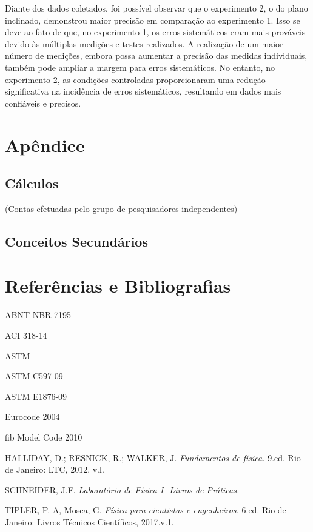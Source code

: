 \documentclass[12pt, letterpaper]{article}
\begin{document}
Diante dos dados coletados, foi possível observar que o experimento 2, o do plano inclinado, demonstrou maior precisão em comparação ao experimento 1. Isso se deve ao fato de que, no experimento 1, os erros sistemáticos eram mais prováveis devido às múltiplas medições e testes realizados. A realização de um maior número de medições, embora possa aumentar a precisão das medidas individuais, também pode ampliar a margem para erros sistemáticos. No entanto, no experimento 2, as condições controladas proporcionaram uma redução significativa na incidência de erros sistemáticos, resultando em dados mais confiáveis e precisos. 

\section{Apêndice}
\subsection{Cálculos}
 (Contas efetuadas pelo grupo de pesquisadores independentes)
\subsection{Conceitos Secundários}

\section{Referências e Bibliografias}

\begin{thebibliography}{9}
  
ABNT NBR 7195

ACI 318-14

ASTM

ASTM C597-09

ASTM E1876-09

Eurocode 2004

fib Model Code 2010

HALLIDAY, D.; RESNICK, R.; WALKER, J. \emph{Fundamentos de física.} 9.ed. Rio de Janeiro: LTC, 2012. v.l.

SCHNEIDER, J.F. \emph{Laboratório de Física I- Livros de Práticas.}

TIPLER, P. A, Mosca, G. \emph{Física para cientistas e engenheiros.} 6.ed. Rio de Janeiro: Livros Técnicos Científicos, 2017.v.1.



\end{thebibliography}
\end{document}
